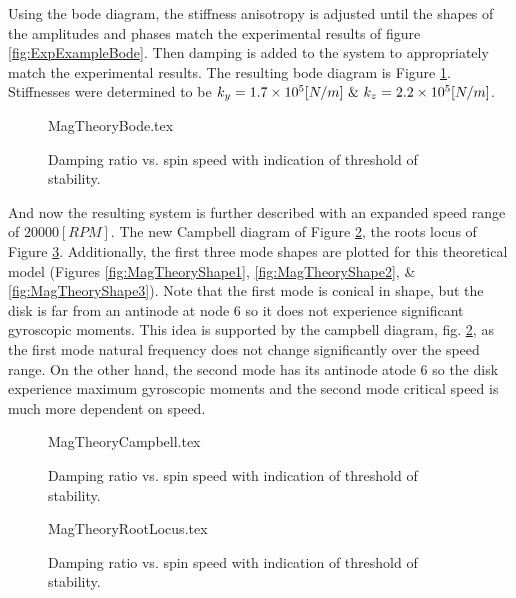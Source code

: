 Using the bode diagram, the stiffness anisotropy is adjusted until the shapes of the amplitudes and phases match the experimental results of figure \ref{fig:ExpExampleBode}. Then damping is added to the system to appropriately match the experimental results. The resulting bode diagram is Figure \ref{fig:MagTheoryBode}. Stiffnesses were determined to be $ k_y=1.7\e{5}[N/m]\ \&\ k_z=2.2\e{5}[N/m] $.
\begin{figure}[!htb]
	\def\width{.6\linewidth}
	\def\height{.4\linewidth}
	\def\sep{3em}
	\centering
	{MagTheoryBode.tex}
	\caption{Damping ratio vs. spin speed with indication of threshold of stability.}
	\label{fig:MagTheoryBode}
\end{figure}
And now the resulting system is further described with an expanded speed range of $ 20000[RPM] $. The new Campbell diagram of Figure \ref{fig:MagTheoryCampbell}, the roots locus of Figure \ref{fig:MagTheoryRootLocus}. Additionally, the first three mode shapes are plotted for this theoretical model (Figures \ref{fig:MagTheoryShape1}, \ref{fig:MagTheoryShape2}, \& \ref{fig:MagTheoryShape3}). Note that the first mode is conical in shape, but the disk is far from an antinode at node 6 so it does not experience significant gyroscopic moments. This idea is supported by the campbell diagram, fig. \ref{fig:MagTheoryCampbell}, as the first mode natural frequency does not change significantly over the speed range. On the other hand, the second mode has its antinode atode 6 so the disk experience maximum gyroscopic moments and the second mode critical speed is much more dependent on speed.
\begin{figure}[!htb]
	\def\width{.6\linewidth}
	\def\height{.4\linewidth}
	\def\sep{3em}
	\centering
	{MagTheoryCampbell.tex}
	\caption{Damping ratio vs. spin speed with indication of threshold of stability.}
	\label{fig:MagTheoryCampbell}
\end{figure}
\begin{figure}[!htb]
	\def\width{.6\linewidth}
	\def\height{.4\linewidth}
	\def\sep{3em}
	\centering
	{MagTheoryRootLocus.tex}
	\caption{Damping ratio vs. spin speed with indication of threshold of stability.}
	\label{fig:MagTheoryRootLocus}
\end{figure}
